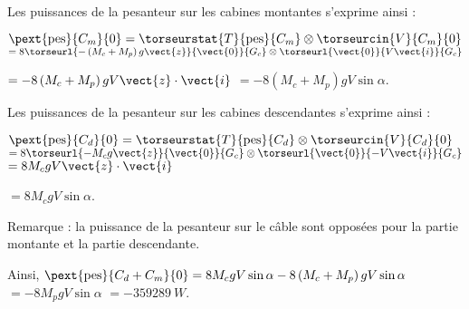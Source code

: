 \ifprof\begin{corrige} ~\\

Les puissances de la pesanteur sur les cabines montantes s'exprime ainsi : 

$\pext{\text{pes}}{C_m}{0} = \torseurstat{T}{\text{pes}}{C_m} \otimes \torseurcin{V}{C_m}{0}$
$ = 8 \torseurl{-\left(M_c+M_p\right)g \vect{z}}{\vect{0}}{G_c} \otimes \torseurl{\vect{0}}{V\vect{i}}{G_c}	$

$ = -8\left(M_c+M_p\right)gV\vect{z} \cdot \vect{i}$
$ = -8\left(M_c+M_p\right)gV \sin \alpha$.


Les puissances de la pesanteur sur les cabines descendantes s'exprime ainsi : 

$\pext{\text{pes}}{C_d}{0} = \torseurstat{T}{\text{pes}}{C_d} \otimes \torseurcin{V}{C_d}{0}$
$ = 8 \torseurl{-M_c g \vect{z}}{\vect{0}}{G_c} \otimes \torseurl{\vect{0}}{-V\vect{i}}{G_c}	$
$ = 8M_cgV\vect{z} \cdot \vect{i}$

$ = 8M_c gV \sin \alpha$.

Remarque : la puissance de la pesanteur sur le câble sont opposées pour la partie montante et la partie descendante.


Ainsi, $\pext{\text{pes}}{C_d+C_m}{0}=8M_c gV \sin \alpha -8\left(M_c+M_p\right)gV \sin \alpha$ 
$=-8M_pgV \sin \alpha$
$=\SI{-359289}{W}$.

\end{corrige}\else\fi


